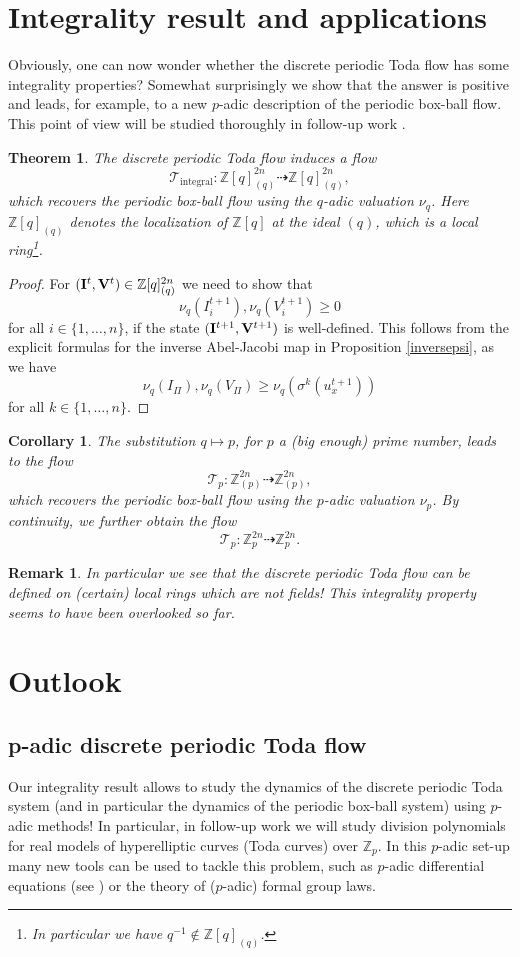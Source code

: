 \documentclass[11pt, a4paper]{amsart}
\newcommand{\eqst}[1]{\begin{equation*}#1\end{equation*}}
\theoremstyle{plain}
\newtheorem{theorem}{Theorem}[section]
\newtheorem{corollary}{Corollary}[section]
\newtheorem{remark}{Remark}[section]
\numberwithin{equation}{section}
\begin{document}
\section{Integrality result and applications}
\noindent Obviously, one can now wonder whether the discrete periodic Toda flow has some integrality properties? Somewhat surprisingly we show that the answer is positive and leads, for example, to a new $p$-adic description of the periodic box-ball flow. This point of view will be studied thoroughly in follow-up work \cite{yalkinoglu}.
\begin{theorem}
\label{integrality}
The discrete periodic Toda flow induces a flow \eqst{\mathcal T_{\mathrm{integral}} : \mathbb Z[q]_{(q)}^{2n} \dashrightarrow \mathbb Z[q]_{(q)}^{2n},} which recovers the periodic box-ball flow using the $q$-adic valuation $\nu_q$. Here $\mathbb Z[q]_{(q)}$ denotes the localization of $\mathbb Z[q]$ at the ideal $(q)$, which is a local ring\footnote{In particular we have $q^{-1} \notin \mathbb Z[q]_{(q)}$.}.
\end{theorem}
\begin{proof}
For $(\bold{I}^t,\bold{V}^t) \in \mathbb Z[q]_{(q)}^{2n} $ we need to show that \eqst{\nu_q(I^{t+1}_i),\nu_q(V^{t+1}_i) \geq 0} for all $i \in \{1,\dots,n\}$, if the state $(\bold{I}^{t+1},\bold{V}^{t+1})$ is well-defined. This follows from the explicit formulas for the inverse Abel-Jacobi map in Proposition \ref{inversepsi}, as we have \eqst{\nu_q(I_{\Pi}),\nu_q(V_{\Pi}) \geq \nu_q(\sigma^k(u^{t+1}_x))} for all $k \in \{1,\dots,n\}$.
\end{proof}
\begin{corollary}
\label{padic}
The substitution $q \mapsto p$, for $p$ a (big enough) prime number, leads to the flow
\eqst{\mathcal T _p : \mathbb Z_{(p)}^{2n} \dashrightarrow \mathbb Z_{(p)}^{2n},} which recovers the periodic box-ball flow using the $p$-adic valuation $\nu_p$.
By continuity, we further obtain the flow \eqst{\mathcal T _p : \mathbb Z _p^{2n} \dashrightarrow \mathbb Z _p^{2n}.}
\end{corollary}
\begin{remark}
In particular we see that the discrete periodic Toda flow can be defined on (certain) local rings which are not fields! This integrality property seems to have been overlooked so far.
\end{remark}
\section{Outlook}
\subsection*{p-adic discrete periodic Toda flow}
Our integrality result allows to study the dynamics of the discrete periodic Toda system (and in particular the dynamics of the periodic box-ball system) using $p$-adic methods! In particular, in follow-up work we will study division polynomials for real models of hyperelliptic curves (Toda curves) over $\mathbb Z_p$. In this $p$-adic set-up many new tools can be used to tackle this problem, such as $p$-adic differential equations (see \cite{eid}) or the theory of ($p$-adic) formal group laws.
\end{document}
